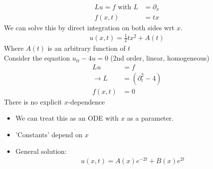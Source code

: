 \documentclass[12pt, letterpaper]{article}
\begin{document}
\begin{align*}
    Lu = f \text{ with } L &= \partial_x  \\
    f(x,t)&= tx
\end{align*}
We can solve this by direct integration on both sides wrt $x$.
\begin{align*}
    u(x,t) = \frac 12 tx^2 + A(t)
\end{align*}
Where $A(t)$ is an arbitrary function of $t$ \\
 Consider the equation $u_{tt} - 4u = 0$ (2nd order, linear, homogeneous)
\begin{align*}
    Lu &= f \\
    \rightarrow L &= (\partial^2_t - 4) \\
    f(x,t) &= 0
\end{align*}
There is no explicit $x$-dependence
\begin{itemize}
    \item We can treat this as an ODE with $x$ as a parameter.
    \item 'Constants' depend on $x$
    \item General solution: 
    \begin{align*}
        u(x,t) = A(x)e^{-2t} + B(x)e^{2t}
    \end{align*}
\end{itemize}
\end{document}
